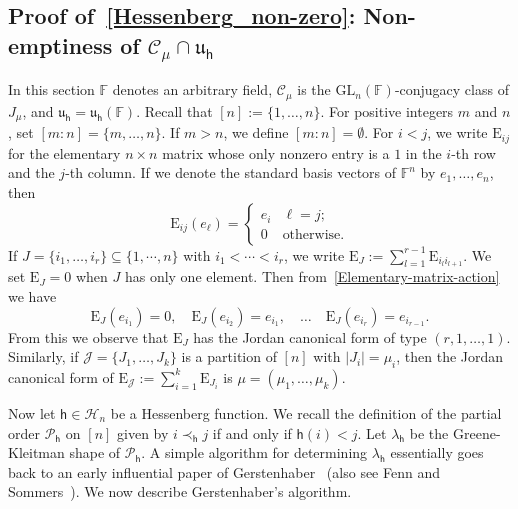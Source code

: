 \documentclass[12pt,a4paper,reqno]{amsart}
\theoremstyle{plain}
\theoremstyle{definition}
\newcommand{\FF}{{\mathbb{F}}}
\newcommand{\1}{\mathds{1}}
\newcommand{\GL}{\mathrm{GL}}
\newcommand{\E}{\mathrm{E}}
\renewcommand{\u}{\mathfrak{u}}
\newcommand{\hes}{\mathsf{h}}
\begin{document}
\subsection{Proof of~\cref{Hessenberg_non-zero}: Non-emptiness of $\mathcal{C}_\mu\cap \u_\hes$} In this section $\FF$ denotes an arbitrary field,
$\mathcal C_\mu$ is the $\GL_n(\FF)$-conjugacy class of $J_\mu$, and $\u_\hes=\u_\hes(\FF)$.
  Recall that
$[n]:= \{ 1, \dots,n \}$. For positive integers $m$ and $n$, set $[ m:n ]=\{ m , \dots,n \}$. If $m>n$, we define $[m:n] =\emptyset$.  For $i<j$, we write $\E_{ij}$ for the elementary $n\times n$ matrix whose only nonzero entry is a $1$ in the $i$-th row and the $j$-th column.  If we denote the standard basis vectors of $\FF^n$ by $e_1, \dots, e_n$, then 
\begin{equation}\label{Elementary-matrix-action}
\E_{ij}(e_\ell)=
\begin{cases}
e_i & \ell=j;\\
0 & \text{otherwise.} 
\end{cases}
\end{equation}
If $J= \{ i_1, \dots, i_r \}
\subseteq \{1,\cdots, n\}$ with $i_1< \cdots < i_r$, we write $\E_J:=\sum_{ l =1}^{r-1} \E_{ i_l i_{l+1} }$. We set $\E_J=0$ when $J$ has only one element. Then from~\cref{Elementary-matrix-action} we have 
\[ \E_J ( e_{i_1})=0,\quad \E_J( e_{i_2})= e_{i_1},\quad  \dots\quad  \E_J( e_{i_r})= e_{i_{r-1}}. \]
From this we observe that $\E_J$ has the Jordan canonical form of type $(r, 1, \dots, 1)$. Similarly, if $\mathcal{J}= \{ J_1, \dots, J_k \}$ is a partition of $[n]$  with $|J_i|=\mu_i$, then the Jordan canonical form of $\E_{\mathcal{J}}:=\sum_{ i=1}^k \E_{J_i}$ is $\mu=(\mu_1, \dots, \mu_k)$.  
\smallskip

Now let $\hes \in \mathcal{H}_n$ be a Hessenberg function. We recall the definition of the partial order $\mathcal{P}_\hes$ on $[n]$ given by $i \prec_\hes j$ if and only if $\hes(i) < j$. Let $\lambda_\hes$ be the Greene-Kleitman shape of $\mathcal{P}_\hes$. 
A simple algorithm for determining $\lambda_{\hes}$  essentially goes back to an early influential paper of Gerstenhaber~\cite[p. 535]{MR136683} (also see Fenn and Sommers~\cite[Proposition~6.8]{MR4334164}). We now describe Gerstenhaber's algorithm.
\end{document}
